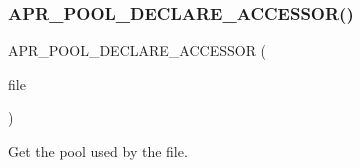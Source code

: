 \subsubsection{\texorpdfstring{A\+P\+R\+\_\+\+P\+O\+O\+L\+\_\+\+D\+E\+C\+L\+A\+R\+E\+\_\+\+A\+C\+C\+E\+S\+S\+O\+R()}{APR\_POOL\_DECLARE\_ACCESSOR()}}
{\footnotesize\ttfamily A\+P\+R\+\_\+\+P\+O\+O\+L\+\_\+\+D\+E\+C\+L\+A\+R\+E\+\_\+\+A\+C\+C\+E\+S\+S\+OR (\begin{DoxyParamCaption}\item[{file}]{ }\end{DoxyParamCaption})}

Get the pool used by the file. 
